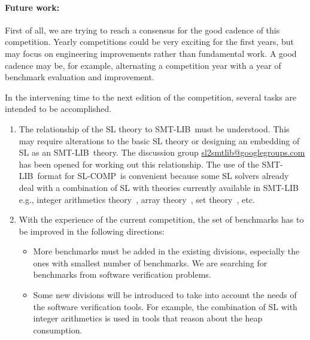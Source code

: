 \documentclass[twoside,11pt]{article}
\newcommand{\smtlib}{\textsf{SMT-LIB}}
\newcommand{\slcomp}{\textsf{SL-COMP}}
\begin{document}
\paragraph{Future work:}
First of all, we are trying to reach a consensus for the good cadence of this competition. Yearly competitions could be very exciting for the first years, but may focus on engineering improvements rather than fundamental work. 
A good cadence may be, for example, alternating a competition year with a year of benchmark evaluation and improvement.

In the intervening time to the next edition of the competition, several tasks are intended to be accomplished.
\begin{enumerate}

\item The relationship of the SL theory to \smtlib\ must be understood. This may require alterations to
the basic SL theory or designing an embedding of SL as an \smtlib\ theory.
The discussion group \url{sl2smtlib@googlegroups.com} has been opened for working out this relationship. 
The use of the \smtlib\ format for \slcomp\ is convenient because some SL solvers already deal with a combination of SL with theories currently available in \smtlib\, e.g., 
integer arithmetics theory~\cite{PerezR11}, array theory~\cite{BouajjaniDES12-vmcai}, set theory~\cite{PiskacWZ13}, etc.


\item With the experience of the current competition, the set of benchmarks has to be improved in the following directions:
\begin{itemize}
\item More benchmarks must be added in the existing divisions, especially the ones with smallest number of benchmarks. 
We are searching for benchmarks from software verification problems.

\item Some new divisions will be introduced to take into account the needs of the software verification tools. For example, the combination of SL with integer arithmetics is used in tools that reason about the heap consumption.


\end{itemize}
\end{enumerate}
\end{document}
